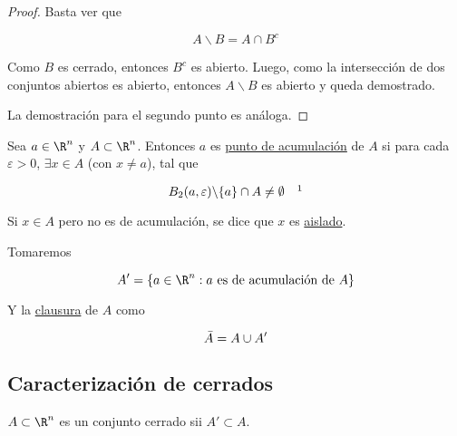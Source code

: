 \begin{proof}
    Basta ver que
    
    \[
    A \backslash B = A \cap B^c
    \]
    
    Como $B$ es cerrado, entonces $B^c$ es abierto. Luego, como la intersección de dos conjuntos abiertos es abierto, entonces $A \backslash B$ es abierto y queda demostrado.
    
    La demostración para el segundo punto es análoga.
\end{proof}

\begin{defn}
    Sea $a \in \R^n$ y $A \subset \R^n$. Entonces $a$ es \ul{punto de acumulación} de $A$ si para cada $\varepsilon > 0$, $\exists x \in A$ (con $x \neq a$), tal que
    
    \[
    B_2(a, \varepsilon) \backslash \{a\} \cap A \neq \emptyset \quad \footnotemark
    \]
    
    Si $x \in A$ pero no es de acumulación, se dice que $x$ es \ul{aislado}.
\end{defn}

\begin{nota}
    Tomaremos
    
    \[
    A' = \{a \in \R^n : \text{$a$ es de acumulación de $A$}\}
    \]
    
    Y la \ul{clausura} de $A$ como
    
    \[
    \Bar{A} = A \cup A'
    \]
\end{nota}

\subsection{Caracterización de cerrados}

\begin{pro}
    $A \subset \R^n$ es un conjunto cerrado sii $A' \subset A$.
\end{pro}


